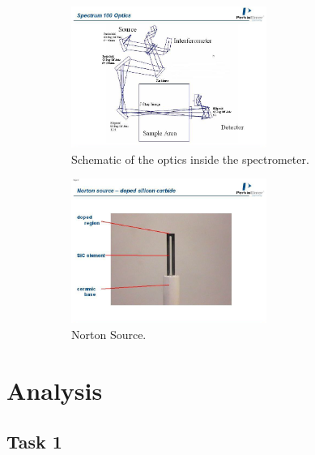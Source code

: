 \documentclass{article}
\begin{document}
\begin{figure}[h]
	\begin{subfigure}[t]{0.48\textwidth}
    	\centering
    	\includegraphics[width=0.7\textwidth]{Figures/Introduction/Schematic1.png}
    	\caption{Schematic of the optics inside the spectrometer. \cite{riede_rotationvibration}}
    	\label{fig:spectrometer_optics}
	\end{subfigure}
	\begin{subfigure}[t]{0.48\textwidth}
		\centering
		\includegraphics[width=0.7\textwidth]{Figures/Introduction/Schematic2.png}
		\caption{Norton Source.}
		\label{fig:nortonsource}
	\end{subfigure}
	\caption{}
\end{figure}


\pagebreak{}

\section{Analysis}

\subsection{Task 1}
\end{document}
